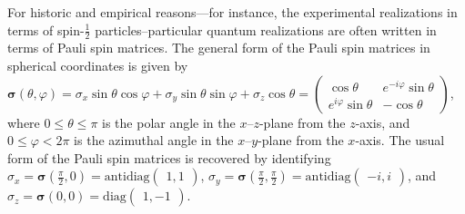 \documentclass[sn-mathphys]{sn-jnl}%
\theoremstyle{thmstyleone}%
\theoremstyle{thmstyletwo}%
\theoremstyle{thmstylethree}%
\begin{document}
For historic and empirical reasons---for instance, the experimental realizations in terms of spin-$\frac{1}{2}$
particles--particular quantum realizations are often written in terms of Pauli spin matrices.
The general form of the Pauli spin matrices in spherical coordinates is given by
$
\bm{\sigma}( \theta ,\varphi )= \sigma_x \sin\theta \cos\varphi  + \sigma_y \sin\theta \sin\varphi  + \sigma_z \cos\theta =
\begin{pmatrix} \cos \theta  &e^{-i\varphi} \sin \theta   \\
  e^{i\varphi}\sin \theta  & -\cos \theta
  \end{pmatrix}
$, where $0 \le \theta \le \pi$ is the polar angle in the $x$--$z$-plane
from the $z$-axis,
and $0 \le \varphi < 2 \pi$ is the azimuthal angle in the $x$--$y$-plane
from the $x$-axis.
The usual form of the Pauli spin matrices is recovered by identifying
$
\sigma_x = \bm{\sigma} \left(\frac{\pi}{2},0\right)= \mathrm{antidiag}\begin{pmatrix} 1 , 1  \end{pmatrix}
$,
$
\sigma_y = \bm{\sigma} \left(\frac{\pi}{2},\frac{\pi}{2}\right)= \mathrm{antidiag}\begin{pmatrix} -i ,   i  \end{pmatrix}
$,
and
$
\sigma_z = \bm{\sigma} \left(0,0\right)= \mathrm{diag} \begin{pmatrix} 1 ,  -1   \end{pmatrix}
$.
\end{document}
